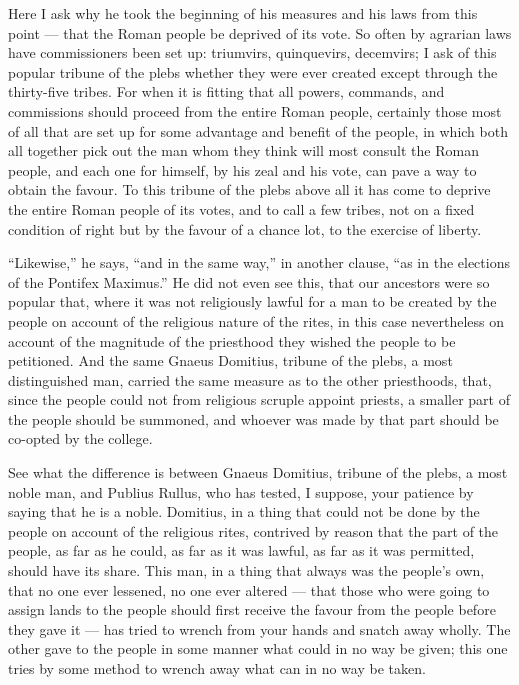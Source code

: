  Here I ask why he took the beginning of his measures and his laws from this point --- that the Roman people be deprived of its vote. So often by agrarian laws have commissioners been set up: triumvirs, quinquevirs, decemvirs; I ask of this popular tribune of the plebs whether they were ever created except through the thirty-five tribes. For when it is fitting that all powers, commands, and commissions should proceed from the entire Roman people, certainly those most of all that are set up for some advantage and benefit of the people, in which both all together pick out the man whom they think will most consult the Roman people, and each one for himself, by his zeal and his vote, can pave a way to obtain the favour. To this tribune of the plebs above all it has come to deprive the entire Roman people of its votes, and to call a few tribes, not on a fixed condition of right but by the favour of a chance lot, to the exercise of liberty.

 ``Likewise,'' he says, ``and in the same way,'' in another clause, ``as in the elections of the Pontifex Maximus.'' He did not even see this, that our ancestors were so popular that, where it was not religiously lawful for a man to be created by the people on account of the religious nature of the rites, in this case nevertheless on account of the magnitude of the priesthood they wished the people to be petitioned. And the same Gnaeus Domitius, tribune of the plebs, a most distinguished man, carried the same measure as to the other priesthoods, that, since the people could not from religious scruple appoint priests, a smaller part of the people should be summoned, and whoever was made by that part should be co-opted by the college.

 See what the difference is between Gnaeus Domitius, tribune of the plebs, a most noble man, and Publius Rullus, who has tested, I suppose, your patience by saying that he is a noble. Domitius, in a thing that could not be done by the people on account of the religious rites, contrived by reason that the part of the people, as far as he could, as far as it was lawful, as far as it was permitted, should have its share. This man, in a thing that always was the people's own, that no one ever lessened, no one ever altered --- that those who were going to assign lands to the people should first receive the favour from the people before they gave it --- has tried to wrench from your hands and snatch away wholly. The other gave to the people in some manner what could in no way be given; this one tries by some method to wrench away what can in no way be taken.

